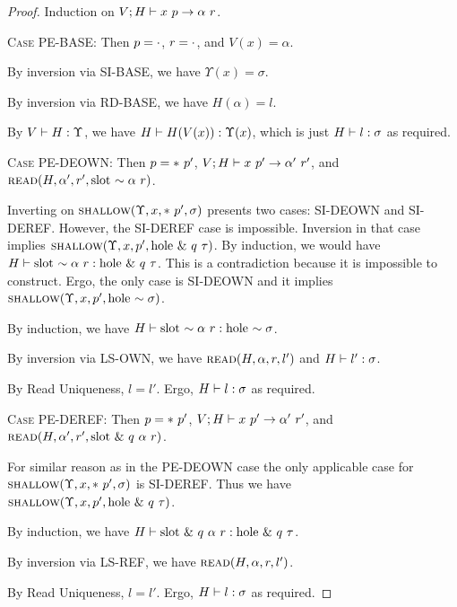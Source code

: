 \documentclass{article}
\begin{document}
\begin{proof}
  Induction on ${{V};{H}} \vdash {{x}\ {p}} \rightarrow {{\alpha}\ {r}}$.

  \textsc{Case PE-BASE}:
    Then $p = \cdot$, $r = \cdot$,  and $V(x) = \alpha$.

    By inversion via \textsc{SI-BASE}, we have $\Upsilon(x) = \sigma$.

    By inversion via \textsc{RD-BASE}, we have $H(\alpha) = l$.

    By ${V} \vdash {H} : {\Upsilon}$, we have ${H} \vdash {H(V(x))} : {\Upsilon(x)}$,
    which is just ${H} \vdash {l} : {\sigma}$ as required.

  \textsc{Case PE-DEOWN}:
    Then $p = *\ {p'}$, ${{V};{H}} \vdash {{x}\ {p'}} \rightarrow {{\alpha'}\ {r'}}$, and
    $\textsc{read}({H},{\alpha'},{r'},{\textrm{slot}\ {\sim {{\alpha}\ {r}}}})$.

    Inverting on $\textsc{shallow}({\Upsilon},{x},{*\ {p'}},{\sigma})$ presents two cases:
    \textsc{SI-DEOWN} and \textsc{SI-DEREF}. However, the \textsc{SI-DEREF} case is impossible.
    Inversion in that case implies $\textsc{shallow}({\Upsilon},{x},{p'},{\textrm{hole}\ {\&\ {q}\ {\tau}}})$.
    By induction, we would have ${H} \vdash {\textrm{slot}\ {\sim {{\alpha}\ {r}}}} : {\textrm{hole}\ {\&\ {q}\ {\tau}}}$.
    This is a contradiction because it is impossible to construct.
    Ergo, the only case is \textsc{SI-DEOWN} and it implies
    $\textsc{shallow}({\Upsilon},{x},{p'},{\textrm{hole}\ {\sim {\sigma}}})$.

    By induction, we have ${H} \vdash {\textrm{slot}\ {\sim {{\alpha}\ {r}}}} : {\textrm{hole}\ {\sim {\sigma}}}$.

    By inversion via \textsc{LS-OWN}, we have $\textsc{read}({H},{\alpha},{r},{l'})$ and ${H} \vdash {l'} : {\sigma}$.

    By Read Uniqueness, $l = l'$. Ergo, ${H} \vdash {l} : {\sigma}$ as required.

  \textsc{Case PE-DEREF}:
    Then $p = *\ {p'}$, ${{V};{H}} \vdash {{x}\ {p'}} \rightarrow {{\alpha'}\ {r'}}$, and
    $\textsc{read}({H},{\alpha'},{r'},{\textrm{slot}\ {\&\ {q}\ {\alpha}\ {r}}})$.

    For similar reason as in the \textsc{PE-DEOWN} case the only applicable case for
    $\textsc{shallow}({\Upsilon},{x},{*\ {p'}},{\sigma})$ is \textsc{SI-DEREF}.
    Thus we have $\textsc{shallow}({\Upsilon},{x},{p'},{\textrm{hole}\ {\&\ {q}\ {\tau}}})$.

    By induction, we have ${H} \vdash {\textrm{slot}\ {\&\ {q}\ {\alpha}\ {r}}} : {\textrm{hole}\ {\&\ {q}\ {\tau}}}$.

    By inversion via \textsc{LS-REF}, we have $\textsc{read}({H},{\alpha},{r},{l'})$.

    By Read Uniqueness, $l = l'$. Ergo, ${H} \vdash {l} : {\sigma}$ as required.


\end{proof}
\end{document}
